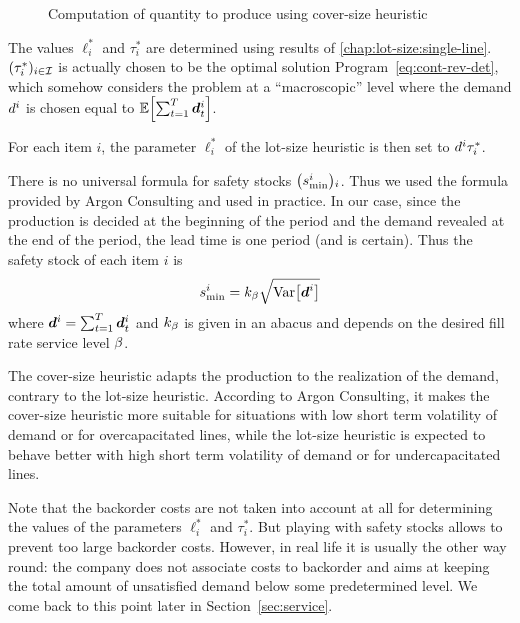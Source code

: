 \begin{figure}[h]
  \centering
  \caption{Computation of quantity to produce using cover-size heuristic}
  \label{fig:cover-size-production}
\end{figure}


The values $\ell_i^*$ and $\tau_i^*$ are determined using results of \cref{chap:lot-size:single-line}. $(\tau_i^*)_{i\in\mathcal{I}}$ is actually chosen to be the optimal solution Program~\eqref{eq:cont-rev-det}, which somehow considers the problem at a ``macroscopic'' level
where the demand $d^i$ is chosen equal to $\espe\sqbracket{\sum_{t=1}^{\horizon}\va d_t^i}$.

For each item $i$, the parameter $\ell_i^*$ of the lot-size heuristic is then set to $d^i\tau_i^*$.

There is no universal formula for safety stocks $\bracket{\safety^i}_i$. Thus we used the formula provided by Argon Consulting and used in practice. In our case, since the production is decided at the beginning of the period and the demand revealed at the end of the period, the lead time is one period (and is certain). Thus the safety stock of each item $i$ is
\begin{equation}
  \safety^i = k_{\servicelvl} \sqrt{\vari\sqbracket{\va\demand^i}}
\end{equation}
where $\va\demand^i=\sum_{t=1}^{\horizon}\va\demand_t^i$ and $k_{\beta}$ is given in an abacus and depends on the desired fill rate service level $\beta$. 


\medskip

The cover-size heuristic adapts the production to the realization of the demand, contrary to the lot-size heuristic. According to Argon Consulting, it makes the cover-size heuristic more suitable for situations with low short term volatility of demand or for overcapacitated lines, while the lot-size heuristic is expected to behave better with high short term volatility of demand or for undercapacitated lines.

Note that the backorder costs are not taken into account at all for determining the values of the parameters $\ell_i^*$ and $\tau_i^*$.
But playing with safety stocks allows to prevent too large backorder costs. However, in real life it is usually the other way round: the company does not associate costs to backorder and aims at keeping the total amount of unsatisfied demand below some predetermined level. We come back to this point later in Section~\cref{sec:service}.




